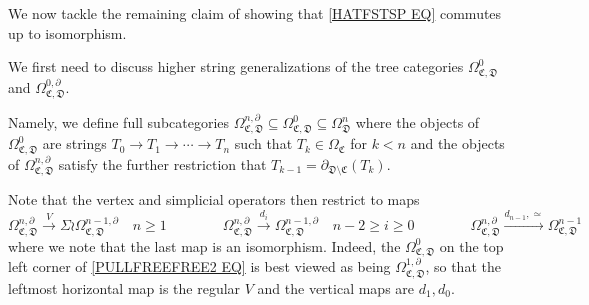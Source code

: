 \documentclass[a4paper,10pt
,draft
]{article}%
\renewcommand{\1}{\eta}%
\begin{document}
We now tackle the remaining claim of showing that
\eqref{HATFSTSP EQ} commutes up to isomorphism.

We first need to discuss higher string generalizations of the tree categories 
$\Omega^{0}_{\mathfrak{C},\mathfrak{D}}$
and
$\Omega^{0,\partial}_{\mathfrak{C},\mathfrak{D}}$.

Namely, we define full subcategories 
$\Omega^{n,\partial}_{\mathfrak{C},\mathfrak{D}}
\subseteq
\Omega^{0}_{\mathfrak{C},\mathfrak{D}}
\subseteq
\Omega^{n}_{\mathfrak{D}}
$
where the objects of 
$\Omega^{0}_{\mathfrak{C},\mathfrak{D}}$
are strings $T_0 \to T_1 \to \cdots \to T_n$
such that $T_k \in \Omega_{\mathfrak{C}}$ for $k<n$
and the objects of 
$\Omega^{n,\partial}_{\mathfrak{C},\mathfrak{D}}$
satisfy the further restriction that
$T_{k-1}=\partial_{\mathfrak{D} \setminus \mathfrak{C}}(T_k)$.


Note that the vertex and simplicial operators then restrict to maps
\[
	\Omega_{\mathfrak{C},\mathfrak{D}}^{n, \partial} 
	\xrightarrow{V}
	\Sigma \wr \Omega_{\mathfrak{C},\mathfrak{D}}^{n-1, \partial} 
\quad
	n \geq 1
\qquad \qquad
	\Omega_{\mathfrak{C},\mathfrak{D}}^{n, \partial} 
	\xrightarrow{d_i}
	\Omega_{\mathfrak{C},\mathfrak{D}}^{n-1, \partial}
\quad
	n-2 \geq i \geq 0
\qquad \qquad
	\Omega_{\mathfrak{C},\mathfrak{D}}^{n, \partial} 
	\xrightarrow{d_{n-1},\simeq}
	\Omega_{\mathfrak{C},\mathfrak{D}}^{n-1}
\]
where we note that the last map is an isomorphism. 
Indeed, the $\Omega^0_{\mathfrak{C},\mathfrak{D}}$ 
on the top left corner of \eqref{PULLFREEFREE2 EQ} is best viewed as
being $\Omega^{1,\partial}_{\mathfrak{C},\mathfrak{D}}$, so that the leftmost horizontal map is the regular $V$ and the vertical maps are $d_1,d_0$.
\end{document}
